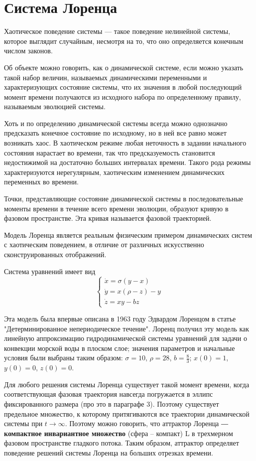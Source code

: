 \documentclass[12pt]{article}
\begin{document}

\newpage

\section{Система Лоренца}
Хаотическое поведение системы — такое поведение нелинейной системы, которое выглядит случайным, несмотря на то, что оно определяется конечным числом законов. 

Об объекте можно говорить, как о динамической системе, если можно указать такой набор величин, называемых динамическими переменными и характеризующих состояние системы, что их значения в любой последующий момент времени получаются из исходного набора по определенному правилу, называемым эволюцией системы.

Хоть и по определению динамической системы всегда можно однозначно предсказать конечное состояние по исходному, но в ней все равно может возникать хаос. В хаотическом режиме любая неточность в задании начального состояния нарастает во времени, так что предсказуемость становится недостижимой на достаточно больших интервалах времени. Такого рода режимы характеризуются нерегулярным, хаотическим изменением динамических переменных во времени.

Точки, представляющие состояние динамической системы в последовательные моменты времени в течение всего времени эволюции, образуют кривую в фазовом пространстве. Эта кривая называется фазовой траекторией. 

Модель Лоренца является реальным физическим примером динамических систем с хаотическим поведением, в отличие от различных искусственно сконструированных отображений.

Система уравнений имеет вид
$$\begin{cases}	
	\dot{x} = \sigma (y-x) \\
	\dot{y} = x(\rho-z)-y \\
	\dot{z} = xy-bz
\end{cases}$$

Эта модель была впервые описана в 1963 году Эдвардом Лоренцом в статье "Детерминированное непериодическое течение". Лоренц получил эту модель как линейную аппроксимацию гидродинамической системы уравнений для задачи о конвекции морской воды в плоском слое; значения параметров и начальные условия были выбраны таким образом: $\sigma = 10$, $\rho = 28$, $b = \frac{8}{3}$; $x(0) = 1$, $y(0) = 0$, $z(0) = 0$.

Для любого решения системы Лоренца существует такой момент времени, когда соответствующая фазовая траектория навсегда погружается в эллипс фиксированного размера (про это в параграфе 3). Поэтому существует предельное множество, к которому притягиваются все траектории динамической системы при $t \rightarrow \infty$. Поэтому можно говорить, что аттрактор Лоренца ― \textbf{компактное инвариантное множество} (сфера -- компакт) L в трехмерном фазовом пространстве гладкого потока. Таким образом, аттрактор определяет поведение решений системы Лоренца на больших отрезках времени.
\end{document}
